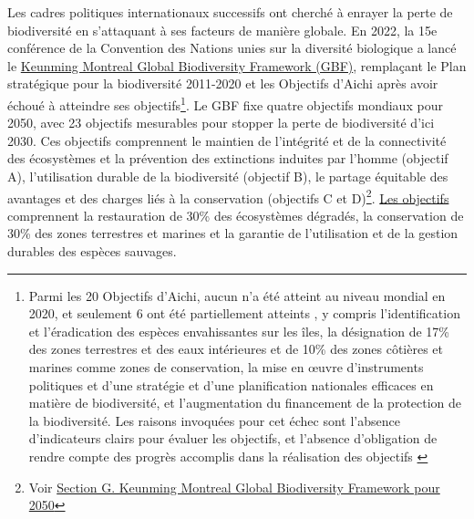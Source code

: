 Les cadres politiques internationaux successifs ont cherché à enrayer la perte de biodiversité en s'attaquant à ses facteurs de manière globale.    En 2022, la 15e conférence de la Convention des Nations unies sur la diversité biologique a lancé le \href{https://www.cbd.int/doc/c/e6d3/cd1d/daf663719a03902a9b116c34/cop-15-l-25-fr. pdf}{Keunming Montreal Global Biodiversity Framework (GBF)}, remplaçant le Plan stratégique pour la biodiversité 2011-2020 et les Objectifs d'Aichi après avoir échoué à atteindre ses objectifs\footnote{Parmi les 20 Objectifs d'Aichi, aucun n'a été atteint au niveau mondial en 2020, et seulement 6 ont été partiellement atteints , y compris l'identification et l'éradication des espèces envahissantes sur les îles, la désignation de 17\% des zones terrestres et des eaux intérieures et de 10\% des zones côtières et marines comme zones de conservation, la mise en œuvre d'instruments politiques et d'une stratégie et d'une planification nationales efficaces en matière de biodiversité, et l'augmentation du financement de la protection de la biodiversité.  Les raisons invoquées pour cet échec sont l'absence d'indicateurs clairs pour évaluer les objectifs, et l'absence d'obligation de rendre compte des progrès accomplis dans la réalisation des objectifs \citep{maron_setting_2021}}. Le GBF fixe quatre objectifs mondiaux pour 2050, avec 23 objectifs mesurables pour stopper la perte de biodiversité d'ici 2030. Ces objectifs comprennent le maintien de l'intégrité et de la connectivité des écosystèmes et la prévention des extinctions induites par l'homme (objectif A), l'utilisation durable de la biodiversité (objectif B), le partage équitable des avantages et des charges liés à la conservation (objectifs C et D)\footnote{Voir \href{https://www.cbd.int/doc/c/e6d3/cd1d/daf663719a03902a9b116c34/cop-15-l-25-fr.pdf}{Section G. Keunming Montreal Global Biodiversity Framework pour 2050}}. \href{https://www.cbd.int/gbf/targets/5}{Les objectifs } comprennent la restauration de 30\% des écosystèmes dégradés, la conservation de 30\% des zones terrestres et marines et la garantie de l'utilisation et de la gestion durables des espèces sauvages.
  
